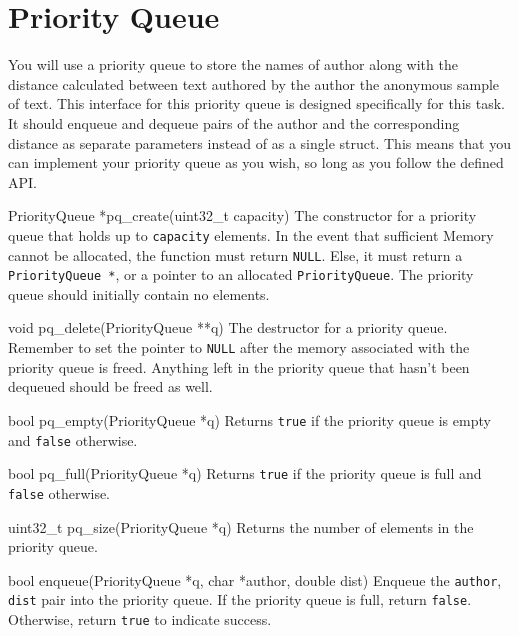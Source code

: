 \section{Priority Queue}\label{sec:pq}

You will use a priority queue to store the names of author along with the
distance calculated between text authored by the author the anonymous sample of
text. This interface for this priority queue is designed specifically for this
task. It should enqueue and dequeue pairs of the author and the corresponding
distance as separate parameters instead of as a single struct. This means that
you can implement your priority queue as you wish, so long as you follow the
defined API.

\begin{funcdoc}{PriorityQueue *pq\_create(uint32\_t capacity)}
  The constructor for a priority queue that holds up to \texttt{capacity}
  elements. In the event that sufficient Memory cannot be allocated, the
  function must return \texttt{NULL}. Else, it must return a
  \texttt{PriorityQueue *}, or a pointer to an allocated \texttt{PriorityQueue}.
  The priority queue should initially contain no elements.
\end{funcdoc}

\begin{funcdoc}{void pq\_delete(PriorityQueue **q)}
  The destructor for a priority queue. Remember to set the pointer to
  \texttt{NULL} after the memory associated with the priority queue is freed.
  Anything left in the priority queue that hasn't been dequeued should be freed
  as well.
\end{funcdoc}

\begin{funcdoc}{bool pq\_empty(PriorityQueue *q)}
  Returns \texttt{true} if the priority queue is empty and \texttt{false}
  otherwise.
\end{funcdoc}

\begin{funcdoc}{bool pq\_full(PriorityQueue *q)}
  Returns \texttt{true} if the priority queue is full and \texttt{false}
  otherwise.
\end{funcdoc}

\begin{funcdoc}{uint32\_t pq\_size(PriorityQueue *q)}
  Returns the number of elements in the priority queue.
\end{funcdoc}

\begin{funcdoc}{bool enqueue(PriorityQueue *q, char *author, double dist)}
  Enqueue the \texttt{author}, \texttt{dist} pair into the priority queue. If
  the priority queue is full, return \texttt{false}. Otherwise, return
  \texttt{true} to indicate success.
\end{funcdoc}

